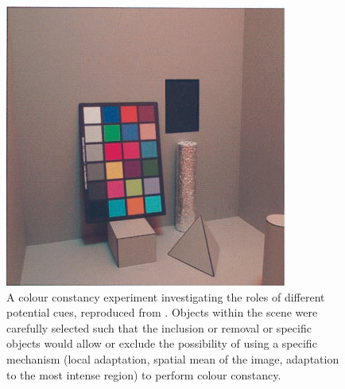\begin{figure}[htbp]
\includegraphics[max width=\textwidth]{figs/tablet/KraftBrainard.png}
\caption{A colour constancy experiment investigating the roles of different potential cues, reproduced from \citet{kraft_mechanisms_1999}. Objects within the scene were carefully selected such that the inclusion or removal or specific objects would allow or exclude the possibility of using a specific mechanism (local adaptation, spatial mean of the image, adaptation to the most intense region) to perform colour constancy.}
\label{fig:KraftBrainard}
\end{figure}


